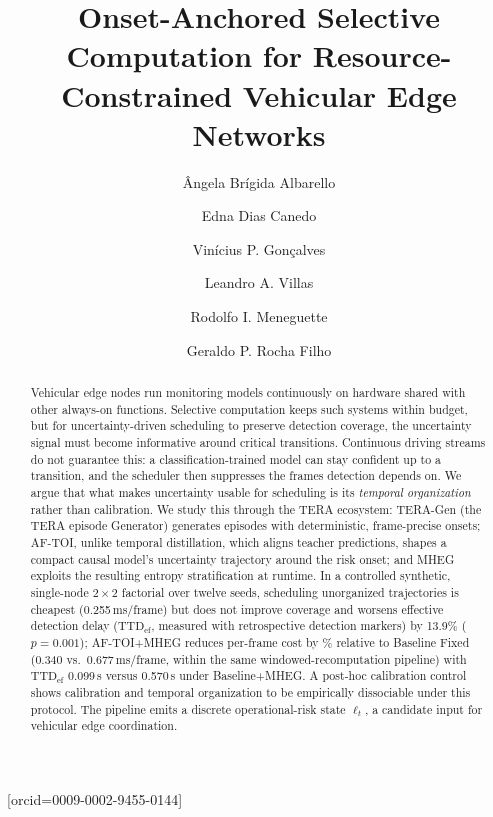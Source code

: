 \documentclass[a4paper,fleqn]{cas-dc}
\begin{document}
\title[mode=title]{Onset-Anchored Selective Computation for Resource-Constrained Vehicular Edge Networks}
\author[1]{{\^A}ngela Br\'igida Albarello}[orcid=0009-0002-9455-0144]
\cormark[1]
\author[1]{Edna Dias Canedo}
\author[1]{Vin\'icius P. Gon\c{c}alves}
\author[2]{Leandro A. Villas}
\author[3]{Rodolfo I. Meneguette}
\author[1,4]{Geraldo P. Rocha Filho}
\begin{abstract}
Vehicular edge nodes run monitoring models continuously on hardware shared
with other always-on functions. Selective computation keeps such systems within budget, but for uncertainty-driven scheduling to preserve detection
coverage, the uncertainty signal must become informative around critical
transitions. Continuous driving streams do not guarantee this: a
classification-trained model can stay confident up to a transition, and the
scheduler then suppresses the frames detection depends on.
We argue that what makes uncertainty usable for scheduling is its
\emph{temporal organization} rather than calibration. We study this through
the TERA ecosystem: \mbox{TERA-Gen} (the TERA episode Generator) generates
episodes with deterministic, frame-precise onsets; \mbox{AF-TOI}, unlike
temporal distillation, which aligns teacher predictions, shapes a compact
causal model's uncertainty trajectory around the risk onset; and \mbox{MHEG}
exploits the resulting entropy stratification at runtime. In a controlled
synthetic, single-node $2\times2$ factorial over twelve seeds, scheduling
unorganized trajectories is cheapest (0.255\,ms/frame) but does not improve
coverage and
worsens effective detection delay ($\mathrm{TTD}_{\mathrm{ef}}$,
measured with retrospective detection markers) by
13.9\% ($p=0.001$); \mbox{AF-TOI}+MHEG reduces per-frame cost by
\CostReduction\% relative to Baseline Fixed (0.340 vs.\ 0.677\,ms/frame,
within the same windowed-recomputation pipeline) with
$\mathrm{TTD}_{\mathrm{ef}}$ 0.099\,s versus 0.570\,s under Baseline+MHEG.
A post-hoc calibration control shows calibration and temporal organization
to be empirically dissociable under this protocol. The pipeline emits a discrete
operational-risk state $\ell_t$, a candidate input for vehicular edge
coordination.
\end{abstract}
\end{document}
